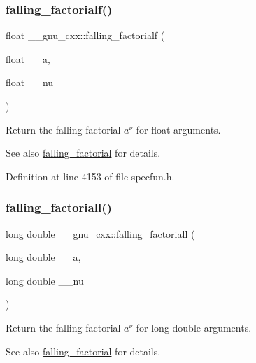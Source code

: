 \subsubsection{\texorpdfstring{falling\+\_\+factorialf()}{falling\_factorialf()}}
{\footnotesize\ttfamily float \+\_\+\+\_\+gnu\+\_\+cxx\+::falling\+\_\+factorialf (\begin{DoxyParamCaption}\item[{float}]{\+\_\+\+\_\+a,  }\item[{float}]{\+\_\+\+\_\+nu }\end{DoxyParamCaption})\hspace{0.3cm}{\ttfamily [inline]}}

Return the falling factorial $ a^{\underline{\nu}} $ for float arguments.

\begin{DoxySeeAlso}{See also}
\hyperlink{group__mathsf__gnu_ga3cc8eb6068c7155ec48b40e20160c5c0}{falling\+\_\+factorial} for details. 
\end{DoxySeeAlso}


Definition at line 4153 of file specfun.\+h.

\mbox{\label{group__mathsf__gnu_gab816c3bcbe00595881799ce969475085}} 
\subsubsection{\texorpdfstring{falling\+\_\+factoriall()}{falling\_factoriall()}}
{\footnotesize\ttfamily long double \+\_\+\+\_\+gnu\+\_\+cxx\+::falling\+\_\+factoriall (\begin{DoxyParamCaption}\item[{long double}]{\+\_\+\+\_\+a,  }\item[{long double}]{\+\_\+\+\_\+nu }\end{DoxyParamCaption})\hspace{0.3cm}{\ttfamily [inline]}}

Return the falling factorial $ a^{\underline{\nu}} $ for {\ttfamily  long double } arguments.

\begin{DoxySeeAlso}{See also}
\hyperlink{group__mathsf__gnu_ga3cc8eb6068c7155ec48b40e20160c5c0}{falling\+\_\+factorial} for details. 
\end{DoxySeeAlso}


